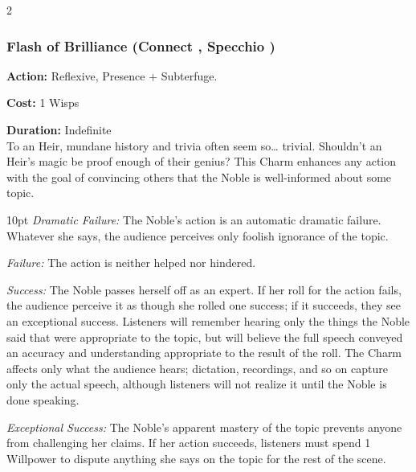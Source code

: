 \begin{multicols}{2}


	
\subsubsection*{Flash of Brilliance (Connect \textbullet\textbullet, Specchio \textbullet\textbullet\textbullet)}

\noindent \textbf{Action:} Reflexive, Presence + Subterfuge.

\noindent \textbf{Cost:} 1 Wisps 

\noindent \textbf{Duration:} Indefinite\\

\noindent To an Heir, mundane history and trivia often seem so… trivial. Shouldn’t an Heir’s magic be proof enough of their genius? This Charm enhances any action with the goal of convincing others that the Noble is well-informed about some topic.

\begin{myindentpar}{10pt}    \emph{Dramatic Failure:} The Noble’s action is an automatic dramatic failure. Whatever she says, the audience perceives only foolish ignorance of the topic.

\emph{Failure:} The action is neither helped nor hindered.

\emph{Success:} The Noble passes herself off as an expert. If her roll for the action fails, the audience perceive it as though she rolled one success; if it succeeds, they see an exceptional success. Listeners will remember hearing only the things the Noble said that were appropriate to the topic, but will believe the full speech conveyed an accuracy and understanding appropriate to the result of the roll. The Charm affects only what the audience hears; dictation, recordings, and so on capture only the actual speech, although listeners will not realize it until the Noble is done speaking.

\emph{Exceptional Success:} The Noble’s apparent mastery of the topic prevents anyone from challenging her claims. If her action succeeds, listeners must spend 1 Willpower to dispute anything she says on the topic for the rest of the scene.

\end{myindentpar}
	

\end{multicols}
